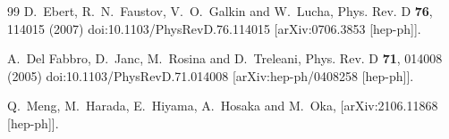 \documentclass[prd,twocolumn,floatfix,nofootinbib]{revtex4}
\begin{document}
\begin{thebibliography}{99}
    D.~Ebert, R.~N.~Faustov, V.~O.~Galkin and W.~Lucha,
    Phys. Rev. D \textbf{76}, 114015 (2007)
    doi:10.1103/PhysRevD.76.114015
    [arXiv:0706.3853 [hep-ph]].


    A.~Del Fabbro, D.~Janc, M.~Rosina and D.~Treleani,
    Phys. Rev. D \textbf{71}, 014008 (2005)
    doi:10.1103/PhysRevD.71.014008
    [arXiv:hep-ph/0408258 [hep-ph]].

    Q.~Meng, M.~Harada, E.~Hiyama, A.~Hosaka and M.~Oka,
    [arXiv:2106.11868 [hep-ph]].

\end{thebibliography}
\end{document}
